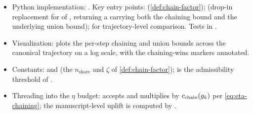 \begin{itemize}
  \item Python implementation:
    .  Key entry points:
     (\cref{def:chain-factor});
     (drop-in replacement
    for  of
    , returning a
     carrying both the chaining bound
    and the underlying union bound);
     for trajectory-level
    comparison.  Tests in .
  \item Visualization:
     plots
    the per-step chaining and union bounds across the canonical
    trajectory on a log scale, with the chaining-wins markers
    annotated.
  \item Constants:
     and
     (the
    $n_{\mathrm{share}}$ and $\zeta$ of \cref{def:chain-factor});
     is the admissibility threshold of
    .
  \item Threading into the $\eta$ budget:
    accepts  and multiplies by
    $c_{\mathrm{chain}}(g_k)$ per \eqref{eq:eta-chaining}; the manuscript-level
    uplift is computed by
    .
\end{itemize}
